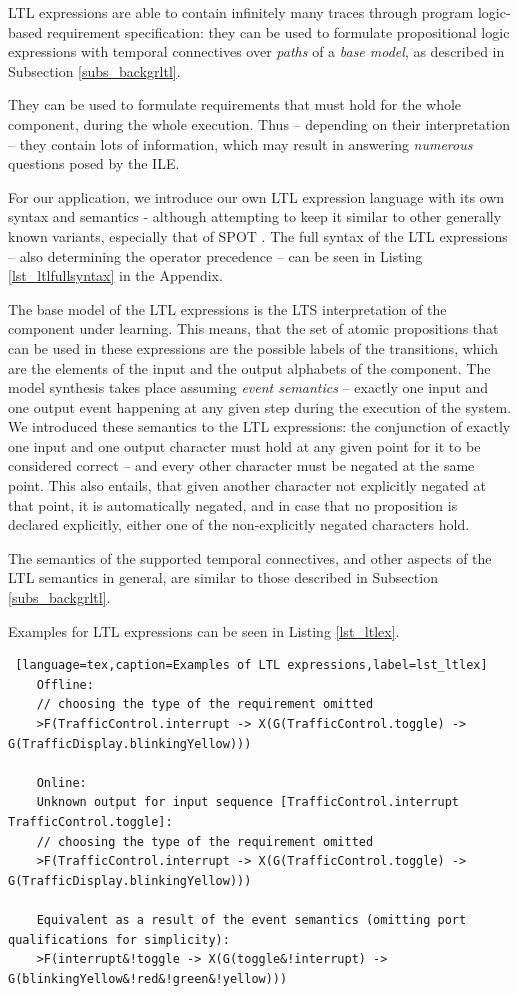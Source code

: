 LTL expressions are able to contain infinitely many traces through program logic-based requirement specification: they can be used to formulate propositional logic expressions with temporal connectives over \textit{paths} of a \textit{base model}, as described in Subsection \ref{subs_backgrltl}. 

They can be used to formulate requirements that must hold for the whole component, during the whole execution. Thus -- depending on their interpretation -- they contain lots of information, which may result in answering \textit{numerous} questions posed by the ILE.

For our application, we introduce our own LTL expression language with its own syntax and semantics - although attempting to keep it similar to other generally known variants, especially that of SPOT \cite{Spot}. The full syntax of the LTL expressions -- also determining the operator precedence -- can be seen in Listing \ref{lst_ltlfullsyntax} in the Appendix.

The base model of the LTL expressions is the LTS interpretation of the component under learning. This means, that the set of atomic propositions that can be used in these expressions are the possible labels of the transitions, which are the elements of the input and the output alphabets of the component. The model synthesis takes place assuming \textit{event semantics} -- exactly one input and one output event happening at any given step during the execution of the system. We introduced these semantics to the LTL expressions: the conjunction of exactly one input and one output character must hold at any given point for it to be considered correct -- and every other character must be negated at the same point. This also entails, that given another character not explicitly negated at that point, it is automatically negated, and in case that no proposition is declared explicitly, either one of the non-explicitly negated characters hold. 

The semantics of the supported temporal connectives, and other aspects of the LTL semantics in general, are similar to those described in Subsection \ref{subs_backgrltl}.

Examples for LTL expressions can be seen in Listing \ref{lst_ltlex}.

\bigskip
\begin{lstlisting} [language=tex,caption=Examples of LTL expressions,label=lst_ltlex]
	Offline:
	// choosing the type of the requirement omitted
	>F(TrafficControl.interrupt -> X(G(TrafficControl.toggle) -> G(TrafficDisplay.blinkingYellow)))

	Online: 
	Unknown output for input sequence [TrafficControl.interrupt TrafficControl.toggle]:
	// choosing the type of the requirement omitted
	>F(TrafficControl.interrupt -> X(G(TrafficControl.toggle) -> G(TrafficDisplay.blinkingYellow)))
	
	Equivalent as a result of the event semantics (omitting port qualifications for simplicity):
	>F(interrupt&!toggle -> X(G(toggle&!interrupt) -> G(blinkingYellow&!red&!green&!yellow)))
\end{lstlisting}

